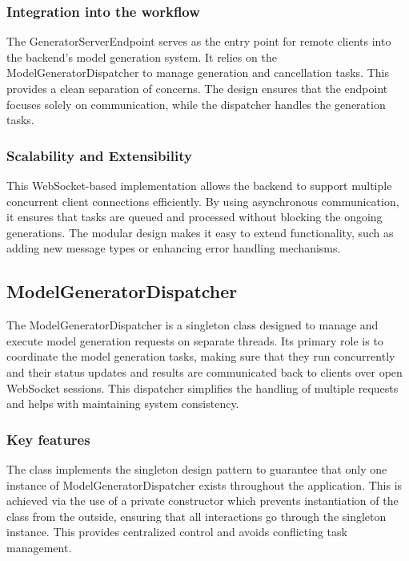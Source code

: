 			\subsubsection{Integration into the workflow}
				The GeneratorServerEndpoint serves as the entry point for remote clients into the backend's model generation system. 
				It relies on the ModelGeneratorDispatcher to manage generation and cancellation tasks. This provides a clean separation of concerns. 
				The design ensures that the endpoint focuses solely on communication, while the dispatcher handles the generation tasks.

			\subsubsection{Scalability and Extensibility}
				This WebSocket-based implementation allows the backend to support multiple concurrent client connections efficiently. 
				By using asynchronous communication, it ensures that tasks are queued and processed without blocking the ongoing generations. 
				The modular design makes it easy to extend functionality, such as adding new message types or enhancing error handling mechanisms.


		\subsection{ModelGeneratorDispatcher}
			The ModelGeneratorDispatcher is a singleton class designed to manage and execute model generation requests on separate threads. 
			Its primary role is to coordinate the model generation tasks, making sure that they run concurrently and their status updates and results are 
			communicated back to clients over open WebSocket sessions. This dispatcher simplifies the handling of multiple requests 
			and helps with maintaining system consistency.

			\subsubsection{Key features}
			The class implements the singleton design pattern to guarantee that only one instance of ModelGeneratorDispatcher exists throughout the application. 
			This is achieved via the use of a private constructor which prevents instantiation of the class from the outside, ensuring 
			that all interactions go through the singleton instance.
			This provides centralized control and avoids conflicting task management.


